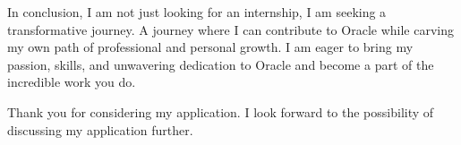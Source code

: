 \documentclass[11pt,letterpaper,roman]{moderncv}
\begin{document}
In conclusion, I am not just looking for an internship, I am seeking a transformative journey. A journey where I can contribute to Oracle while carving my own path of professional and personal growth. I am eager to bring my passion, skills, and unwavering dedication to Oracle and become a part of the incredible work you do.

Thank you for considering my application. I look forward to the possibility of discussing my application further.



\makeletterclosing
\end{document}
